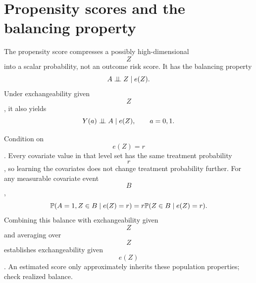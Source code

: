 \section{Propensity scores and the balancing property}
The propensity score compresses a possibly high-dimensional $$Z$$ into a scalar probability, not an outcome risk score. It has the balancing property
\begin{equation}
A\mathrel{\perp\!\!\!\perp} Z\mid e(Z).
\end{equation}
Under exchangeability given $$Z$$, it also yields
\begin{equation}
Y(a)\mathrel{\perp\!\!\!\perp} A\mid e(Z),\qquad a=0,1.
\end{equation}
\begin{supplement}
Condition on $$e(Z)=r$$. Every covariate value in that level set has the same treatment probability $$r$$, so learning the covariates does not change treatment probability further. For any measurable covariate event $$B$$,
\begin{equation}
\mathbb P(A=1,Z\in B\mid e(Z)=r)=r\mathbb P(Z\in B\mid e(Z)=r).
\end{equation}
Combining this balance with exchangeability given $$Z$$ and averaging over $$Z$$ establishes exchangeability given $$e(Z)$$. An estimated score only approximately inherits these population properties; check realized balance.
\end{supplement}

